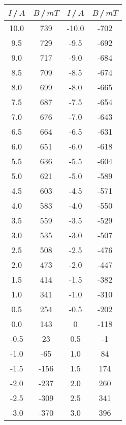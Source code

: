     \begin{table}[H]
        \centering
        \begin{tabular}{c c c c}
            \toprule
            $I$\,/\,$\unit{A}$ & $B$\,/\,$\unit{mT}$ &$I$\,/\,$\unit{A}$ & $B$\,/\,$\unit{mT}$\\
            \midrule
            10.0  &  739   &  -10.0  & -702 \\
            9.5   &  729   &  -9.5   & -692 \\
            9.0   &  717   &  -9.0   & -684 \\
            8.5   &  709   &  -8.5   & -674 \\
            8.0   &  699   &  -8.0   & -665 \\
            7.5   &  687   &  -7.5   & -654 \\
            7.0   &  676   &  -7.0   & -643 \\
            6.5   &  664   &  -6.5   & -631 \\
            6.0   &  651   &  -6.0   & -618 \\
            5.5   &  636   &  -5.5   & -604 \\
            5.0   &  621   &  -5.0   & -589 \\
            4.5   &  603   &  -4.5   & -571 \\
            4.0   &  583   &  -4.0   & -550 \\
            3.5   &  559   &  -3.5   & -529 \\
            3.0   &  535   &  -3.0   & -507 \\
            2.5   &  508   &  -2.5   & -476 \\
            2.0   &  473   &  -2.0   & -447 \\
            1.5   &  414   &  -1.5   & -382 \\
            1.0   &  341   &  -1.0   & -310 \\
            0.5   &  254   &  -0.5   & -202 \\
            0.0   &  143   &   0     & -118 \\
            -0.5  &   23   &   0.5   & -1   \\
            -1.0  &  -65   &   1.0   & 84   \\
            -1.5  &  -156  &   1.5   & 174  \\
            -2.0  &  -237  &   2.0   & 260  \\
            -2.5  &  -309  &   2.5   & 341  \\
            -3.0  &  -370  &   3.0   & 396  \\

\end{tabular}
\end{table}
